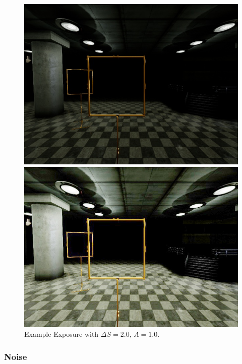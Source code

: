 \begin{figure}[htbp]
	\centering
	\begin{minipage}{0.49\textwidth}
		\includegraphics[width=\textwidth]{fig/gate_example}
	\end{minipage}
	\begin{minipage}{0.49\textwidth}
		\includegraphics[width=\textwidth]{fig/gate_example_exposure}
	\end{minipage}
	\caption{Example Exposure with $\Delta S = 2.0$, $A = 1.0$.}
	\label{fig:exposure}
\end{figure}

\subsubsection{Noise}


